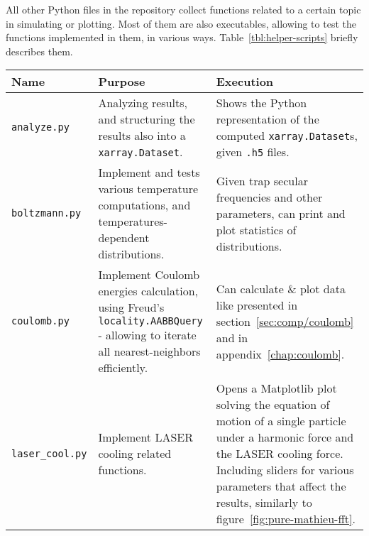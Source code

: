 All other Python files in the repository collect functions related to a certain topic in simulating or plotting. Most of them are also executables, allowing to test the functions implemented in them, in various ways. Table~\ref{tbl:helper-scripts} briefly describes them.

\begin{sidewaystable}[h]
\begin{tabularx}{\textwidth}{l|X|X}
\textbf{Name}                   & \textbf{Purpose}                                                                                                                                       & \textbf{Execution}                                                                                                                                                                                                                                   \\
\hline
\texttt{analyze.py}             & Analyzing results, and structuring the results also into a \texttt{xarray.Dataset}.                                                                    & Shows the Python representation of the computed \texttt{xarray.Dataset}s, given \texttt{.h5} files.                                                                                                                                                  \\
\hline
\texttt{boltzmann.py}           & Implement and tests various temperature computations, and temperatures-dependent distributions.                                                        & Given trap secular frequencies and other parameters, can print and plot statistics of distributions.                                                                                                                                                 \\
\hline
\texttt{coulomb.py}             & Implement Coulomb energies calculation, using Freud's\cite{freud} \texttt{locality.AABBQuery} - allowing to iterate all nearest-neighbors efficiently. & Can calculate \& plot data like presented in section~\ref{sec:comp/coulomb} and in appendix~\ref{chap:coulomb}.                                                                                                                                       \\
\hline
\texttt{laser\_cool.py}         & Implement LASER cooling related functions.                                                                                                             & Opens a Matplotlib plot solving the equation of motion of a single particle under a harmonic force and the LASER cooling force. Including sliders for various parameters that affect the results, similarly to figure~\ref{fig:pure-mathieu-fft}.    \\

\end{tabularx}
\end{sidewaystable}
